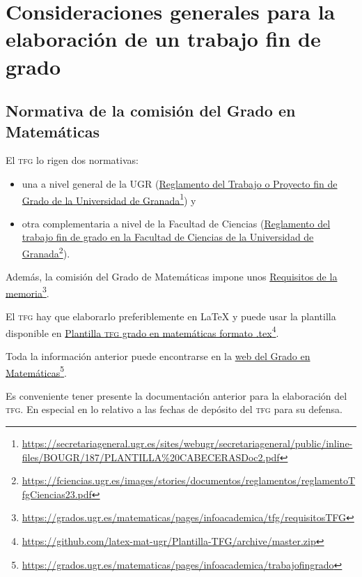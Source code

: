 \chapter[Consideraciones elaboración TFG]{Consideraciones generales para la elaboración de un trabajo fin de grado}

\section{Normativa de la comisión del Grado en Matemáticas}

El \textsc{tfg} lo rigen dos normativas:
\begin{itemize}
    \item una a nivel general de la UGR (\href{https://secretariageneral.ugr.es/sites/webugr/secretariageneral/public/inline-files/BOUGR/187/PLANTILLA%20CABECERASDoc2.pdf}{Reglamento del Trabajo o Proyecto fin de Grado de la Universidad de Granada}\footnote{\url{https://secretariageneral.ugr.es/sites/webugr/secretariageneral/public/inline-files/BOUGR/187/PLANTILLA\%20CABECERASDoc2.pdf}}) y 
    \item otra complementaria a nivel de la Facultad de Ciencias  (\href{https://fciencias.ugr.es/images/stories/documentos/reglamentos/reglamentoTfgCiencias23.pdf}{Reglamento del trabajo fin de grado en la Facultad de Ciencias de la Universidad de Granada}\footnote{\url{https://fciencias.ugr.es/images/stories/documentos/reglamentos/reglamentoTfgCiencias23.pdf}}).
\end{itemize}
Además, la comisión del Grado de Matemáticas impone unos \href{https://grados.ugr.es/matematicas/pages/infoacademica/tfg/requisitosTFG}{Requisitos de la memoria}\footnote{\url{https://grados.ugr.es/matematicas/pages/infoacademica/tfg/requisitosTFG}}.

El \textsc{tfg} hay que elaborarlo preferiblemente en LaTeX y puede usar la plantilla disponible en \href{https://github.com/latex-mat-ugr/Plantilla-TFG/archive/master.zip}{Plantilla \textsc{tfg} grado en matemáticas formato .tex}\footnote{\url{https://github.com/latex-mat-ugr/Plantilla-TFG/archive/master.zip}}.

Toda la información anterior puede encontrarse en la \href{https://grados.ugr.es/matematicas/pages/infoacademica/trabajofingrado}{web del Grado en Matemáticas}\footnote{\url{https://grados.ugr.es/matematicas/pages/infoacademica/trabajofingrado}}.

Es conveniente tener presente la documentación anterior para la elaboración del \textsc{tfg}. En especial en lo relativo a las fechas de depósito del \textsc{tfg} para su defensa.

